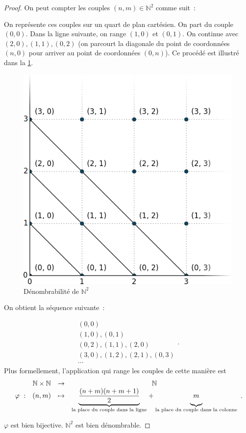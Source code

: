 \documentclass[a4paper,french]{memoir}
\begin{document}
\begin{proof} 
	On peut compter les couples $(n,m) \in \mathbb{N}^2$ comme suit~: \par On représente ces couples sur un quart de plan cartésien. 
	On part du couple $(0, 0)$. Dans la ligne suivante, on range $(1,0) $ et $(0,1)$. On continue avec $(2,0), (1,1), (0,2)$ (on parcourt la diagonale du point de coordonnées $(n,0)$ pour arriver au point de coordonnées $(0,n)$). Ce procédé est illustré dans la  \cref{fig-n_croix_n}.
	\begin{figure}[htb]
		\centering
		\includegraphics[scale=0.3]{n_croix_n.png}
		\caption{Dénombrabilité de $\mathbb{N}^2$}
		\label{fig-n_croix_n}
	\end{figure}
	
	On obtient la séquence suivante~:
	
	\[\begin{array}{l}
		(0,0) \\
		(1,0), (0,1) \\
		(0,2), (1,1), (2,0) \\
		(3,0), (1,2), (2,1), (0,3) \\
		\cdots
	\end{array}.\]
	Plus formellement, l'application qui range les couples de cette manière est 
	\[\begin{array}{cccc}
		\ & \mathbb{N} \times \mathbb{N} & \to & \mathbb{N} \\
		\varphi~: & (n,m) & \mapsto & {\underbrace{\frac{(n+m)(n+m+1)}{2}}_{\text{la place du couple dans la ligne}}} +  {\underbrace{\vphantom{\frac{(n+m)(n+m+1)}{2}} m}_{\text{la place du couple dans la colonne}}}
	\end{array}.\]
	
	
	$\varphi$ est bien bijective. $\mathbb{N}^2$ est bien dénombrable.
\end{proof}
\end{document}
